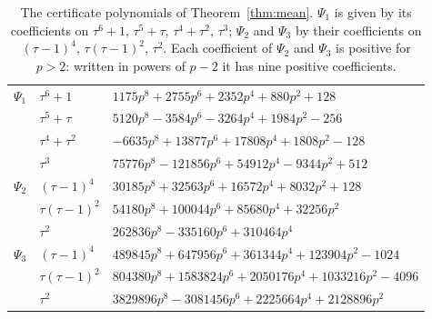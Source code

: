 \begin{table}[htbp]
\centering\small
\caption{The certificate polynomials of Theorem~\ref{thm:mean}. $\Psi_1$ is given by its coefficients on
$\tau^{6}+1$, $\tau^{5}+\tau$, $\tau^{4}+\tau^{2}$, $\tau^{3}$; $\Psi_2$ and $\Psi_3$ by their
coefficients on $(\tau-1)^{4}$, $\tau(\tau-1)^{2}$, $\tau^{2}$. Each coefficient of $\Psi_2$ and
$\Psi_3$ is positive for $p>2$: written in powers of $p-2$ it has nine positive
coefficients.}\label{tab:mean-cert}
\begin{tabular}{@{}lll@{}}
\toprule
$\Psi_1$ & $\tau^{6}+1$ & $1175p^{8}+2755p^{6}+2352p^{4}+880p^{2}+128$\\
 & $\tau^{5}+\tau$ & $5120p^{8}-3584p^{6}-3264p^{4}+1984p^{2}-256$\\
 & $\tau^{4}+\tau^{2}$ & $-6635p^{8}+13877p^{6}+17808p^{4}+1808p^{2}-128$\\
 & $\tau^{3}$ & $75776p^{8}-121856p^{6}+54912p^{4}-9344p^{2}+512$\\
\midrule
$\Psi_2$ & $(\tau-1)^{4}$ & $30185p^{8}+32563p^{6}+16572p^{4}+8032p^{2}+128$\\
 & $\tau(\tau-1)^{2}$ & $54180p^{8}+100044p^{6}+85680p^{4}+32256p^{2}$\\
 & $\tau^{2}$ & $262836p^{8}-335160p^{6}+310464p^{4}$\\
\midrule
$\Psi_3$ & $(\tau-1)^{4}$ & $489845p^{8}+647956p^{6}+361344p^{4}+123904p^{2}-1024$\\
 & $\tau(\tau-1)^{2}$ & $804380p^{8}+1583824p^{6}+2050176p^{4}+1033216p^{2}-4096$\\
 & $\tau^{2}$ & $3829896p^{8}-3081456p^{6}+2225664p^{4}+2128896p^{2}$\\
\bottomrule
\end{tabular}
\end{table}

